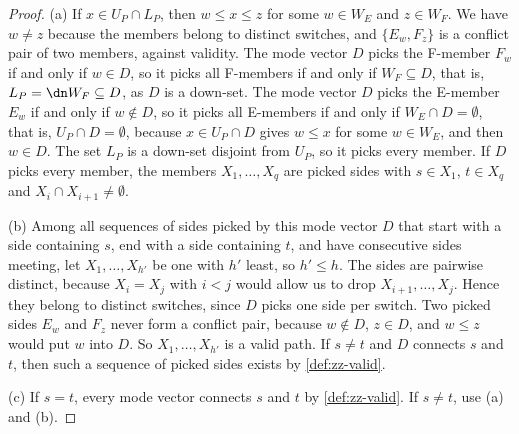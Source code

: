 \begin{proof}
(a) If $x \in U_P \cap L_P$, then $w \leq x \leq z$ for some $w \in W_E$ and $z \in W_F$.
We have $w \neq z$ because the members belong to distinct switches, and $\{E_w, F_z\}$ is a conflict pair of two members, against validity.
The mode vector $D$ picks the F-member $F_w$ if and only if $w \in D$, so it picks all F-members if and only if $W_F \subseteq D$, that is, $L_P = \dn W_F \subseteq D$, as $D$ is a down-set.
The mode vector $D$ picks the E-member $E_w$ if and only if $w \notin D$, so it picks all E-members if and only if $W_E \cap D = \emptyset$, that is, $U_P \cap D = \emptyset$, because $x \in U_P \cap D$ gives $w \leq x$ for some $w \in W_E$, and then $w \in D$.
The set $L_P$ is a down-set disjoint from $U_P$, so it picks every member.
If $D$ picks every member, the members $X_1, \dots, X_q$ are picked sides with $s \in X_1$, $t \in X_q$ and $X_i \cap X_{i+1} \neq \emptyset$.

(b) Among all sequences of sides picked by this mode vector $D$ that start with a side containing $s$, end with a side containing $t$, and have consecutive sides meeting, let $X_1, \dots, X_{h'}$ be one with $h'$ least, so $h' \leq h$.
The sides are pairwise distinct, because $X_i = X_j$ with $i < j$ would allow us to drop $X_{i+1}, \dots, X_j$.
Hence they belong to distinct switches, since $D$ picks one side per switch.
Two picked sides $E_w$ and $F_z$ never form a conflict pair, because $w \notin D$, $z \in D$, and $w \leq z$ would put $w$ into $D$.
So $X_1, \dots, X_{h'}$ is a valid path.
If $s \neq t$ and $D$ connects $s$ and $t$, then such a sequence of picked sides exists by \cref{def:zz-valid}.

(c) If $s = t$, every mode vector connects $s$ and $t$ by \cref{def:zz-valid}.
If $s \neq t$, use (a) and (b).
\end{proof}

